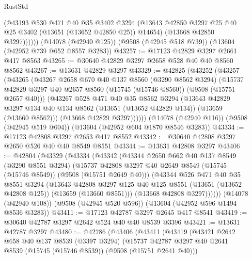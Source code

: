 \begin{lexlean}{RustStd}
\begin{coremodule}
            (@43193
              @530
              @471
              @40
              @35
              @3402
              @3294
              (@13643 @42850 @3297 @25 @40 @25 @3402 (@13651 (@13652 @42850 @25)) @14654)
              (@13668 @42850 @3297))))))
    (@14078 (@42940 @125))
    (@9508 (@42945 @518 @739))
    (@13604 (@42952 @739 @652 @8557 @3283))
@43257 := @17123 @42829 @3297 @2661 @417 @8563
@43265 := @30640 @42829 @3297 @2658 @528 @40 @40 @8560 @8562
@43267 := @13631 @42829 @3297
@43329 := @42825
    (@43252
      (@43257
        (@43265
          (@43267
            @2658
            @670
            @40
            @137
            @8560
            (@3290 @8562 @3294)
            (@15737 @42829 @3297 @40 @2657 @8560 (@15745 (@15746 @8560)) (@9508 (@15751 @2657 @40)))
            (@43267
              @528
              @471
              @40
              @35
              @8562
              @3294
              (@13643
                @42829
                @3297
                @134
                @40
                @134
                @8562
                (@13651 (@13652 @42829 @134))
                (@13659 (@13660 @8562)))
              (@13668 @42829 @3297))))))
    (@14078 (@42940 @116))
    (@9508 (@42945 @519 @604))
    (@13604 (@42952 @604 @1870 @8546 @3283))
@43334 := @17123 @42808 @3297 @2653 @417 @8552
@43342 := @30640 @42808 @3297 @2650 @526 @40 @40 @8549 @8551
@43344 := @13631 @42808 @3297
@43406 := @42804
    (@43329
      (@43334
        (@43342
          (@43344
            @2650
            @662
            @40
            @137
            @8549
            (@3290 @8551 @3294)
            (@15737 @42808 @3297 @40 @2649 @8549 (@15745 (@15746 @8549)) (@9508 (@15751 @2649 @40)))
            (@43344
              @526
              @471
              @40
              @35
              @8551
              @3294
              (@13643
                @42808
                @3297
                @125
                @40
                @125
                @8551
                (@13651 (@13652 @42808 @125))
                (@13659 (@13660 @8551)))
              (@13668 @42808 @3297))))))
    (@14078 (@42940 @108))
    (@9508 (@42945 @520 @596))
    (@13604 (@42952 @596 @1494 @8536 @3283))
@43411 := @17123 @42787 @3297 @2645 @417 @8541
@43419 := @30640 @42787 @3297 @2642 @524 @40 @40 @8539 @3396
@43421 := @13631 @42787 @3297
@43480 := @42786
    (@43406
      (@43411
        (@43419
          (@43421
            @2642
            @658
            @40
            @137
            @8539
            (@3397 @3294)
            (@15737 @42787 @3297 @40 @2641 @8539 (@15745 (@15746 @8539)) (@9508 (@15751 @2641 @40)))

\end{coremodule}
\end{lexlean}
